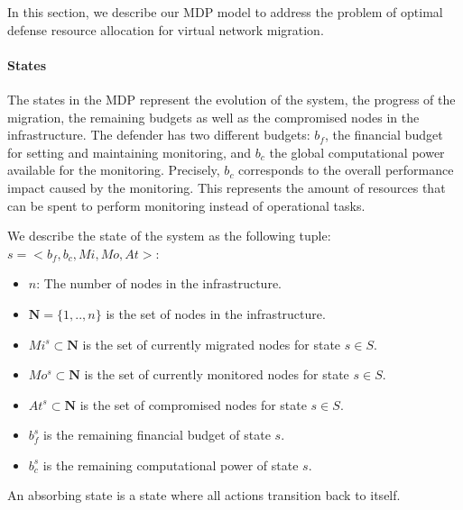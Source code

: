 \label{sec:model}
In this section, we describe our MDP model to address the problem of optimal defense resource allocation for virtual network migration.

\paragraph{States}
\label{sec:stateset}
The states in the MDP represent the evolution of the system, the progress of the migration, the remaining budgets as well as the compromised nodes in the infrastructure.
The defender has two different budgets: $b_f$, the financial budget for setting and maintaining monitoring, and $b_c$ the global computational power available for the monitoring.
Precisely, $b_c$ corresponds to the overall performance impact caused by the monitoring. %
 This represents the amount of resources that can be spent to perform monitoring instead of operational tasks.


We describe the state of the system as the following tuple: $s=<b_f,b_c,Mi,Mo,At>$:
\begin{itemize}
    \item $n$: The number of nodes in the infrastructure.
    \item $\textbf{N} = \{1,..,n\}$ is the set of nodes in the infrastructure.
    \item $Mi^s \subset \textbf{N} $ is the set of currently migrated nodes for state $s\in S$.
    \item $Mo^s \subset \textbf{N}$ is the set of currently monitored nodes for state $s\in S$.
    \item $At^s \subset \textbf{N}$ is the set of compromised nodes for state $s \in S$.
    \item $b_f^s$ is the remaining financial budget of state $s$.
    \item $b_c^s$ is the remaining computational power of state $s$.
\end{itemize}

An absorbing state is a state where all actions transition back to itself.

